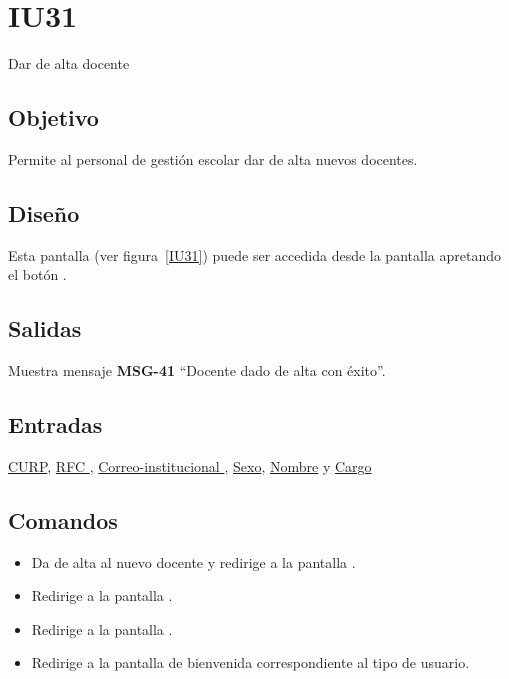 
\section{IU31}{Dar de alta docente}
\subsection{Objetivo}
    Permite al personal de gestión escolar dar de alta nuevos docentes.
\subsection{Diseño}
    Esta pantalla  (ver figura~\ref{IU31}) puede ser accedida desde la pantalla  apretando el botón .

\subsection{Salidas}
Muestra mensaje {\bf MSG-41} ``Docente dado de alta con éxito''.
\subsection{Entradas}
\hyperlink{Docente.CURP }{CURP}, \hyperlink{Docente.RFC }{RFC }, \hyperlink{Docente.Correo-institucional}{ Correo-institucional }, \hyperlink{Docente.Sexo}{Sexo}, \hyperlink{ Docente.Nombre}{Nombre} y \hyperlink{Docente.Cargo}{Cargo}
\subsection{Comandos}
\begin{itemize}
    \item {} Da de alta al nuevo docente y redirige a la pantalla .
    \item {} Redirige a la pantalla .
    \item {} Redirige a la pantalla .
    \item {} Redirige a la pantalla de bienvenida correspondiente al tipo de usuario.
    
\end{itemize}

